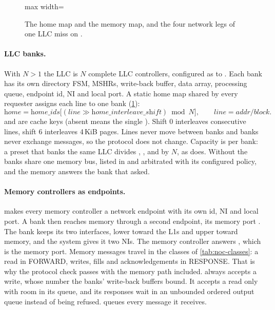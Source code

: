 \begin{figure}[htbp]\centering
\begin{adjustbox}{max width=\textwidth}\end{adjustbox}
\caption{The home map and the memory map, and the four network legs of one LLC miss on
.}
\label{fig:noc-banking}
\end{figure}

\paragraph{LLC banks.} With  $N > 1$ the LLC is $N$ complete LLC controllers,
configured as  to . Each bank has its own
directory FSM, MSHRs, write-back buffer, data array, processing queue, endpoint id, NI and local
port. A
static home map shared by every requester assigns each line to one bank
(\cref{fig:noc-banking}):
\[
\textit{home} = \textit{home\_ids}\big[(\textit{line} \gg \textit{home\_interleave\_shift}) \bmod N\big],
\qquad \textit{line} = \textit{addr}/\textit{block}.
\]
 and  are cache keys (absent means the single
). Shift 0 interleaves consecutive lines, shift 6 interleaves 4\,KiB
pages. Lines never move between banks and banks never exchange messages, so the protocol does not
change. Capacity is per bank: a preset that banks the same LLC divides ,
,  and  by $N$, as
 does. Without  the banks share one memory
bus, listed in  and arbitrated with its configured policy, and the
memory answers the bank that asked.

\paragraph{Memory controllers as endpoints.}  makes every memory
controller a network endpoint with its own id, NI and local port. A bank then reaches memory through a
second endpoint, its memory port . The bank keeps its two interfaces, lower
toward the L1s and upper toward memory, and the system gives it two NIs. The memory controller
answers , which is the memory port. Memory messages travel in the classes of
\cref{tab:noc-classes}: a read in FORWARD, writes, fills and acknowledgements in RESPONSE. That is
why the protocol check passes with the memory path included.  always
accepts a write, whose number the banks' write-back buffers bound. It accepts a read only with room
in its queue, and its responses wait in an unbounded ordered output queue instead of being refused.
 queues every message it receives.


